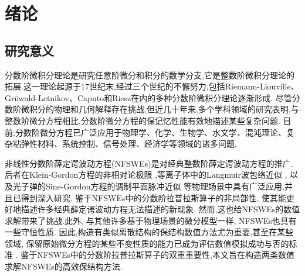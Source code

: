 \chapter[绪论]{绪论}

\section{研究意义}

分数阶微积分理论是研究任意阶微分和积分的数学分支,它是整数阶微积分理论的拓展.这一理论起源于17世纪末,经过三个世纪的不懈努力,包括Riemann-Liouville、Grüwald-Letnikov、Caputo和Riesz在内的多种分数阶微积分理论逐渐形成\cite{samkoFractionalIntegralsDerivatives1993}.
尽管分数阶微积分的物理和几何解释存在挑战,但近几十年来,多个学科领域的研究表明,与整数阶微分方程相比,分数阶微分方程的保记忆性能有效地描述某些复杂问题.
目前,分数阶微分方程已广泛应用于物理学、化学、生物学、水文学、混沌理论、复杂粘弹性材料、系统控制、信号处理、经济学等领域的诸多问题\cite{liIntroductionFractionalCalculus2015,HandbookDifferentialEquations2008,brychkovIndefiniteIntegrals2008,zhangMassBalanceBased2005,carrerasAnomalousDiffusionExit2001,maginSolvingFractionalOrder2009,zaslavskySelfsimilarTransportIncomplete1993,sunRandomorderFractionalDifferential2011}.%

非线性分数阶薛定谔波动方程(NFSWEs)是对经典整数阶薛定谔波动方程的推广.
后者在Klein-Gordon方程的非相对论极限 \cite{tsutsumiNonrelativisticApproximationNonlinear1984,machiharaNonrelativisticLimitEnergy2002},等离子体中的Langmuir波包络近似 \cite{colinSemidiscretizationTimeNonlinear1998},
以及光子弹的Sine-Gordon方程的调制平面脉冲近似 \cite{baoComparisonsSineGordonPerturbed2010,xinModelingLightBullets2000}等物理场景中具有广泛应用,并且已得到深入研究\cite{zhangConservativeNumericalScheme2003,baoUniformErrorEstimates2012,chengSeveralConservativeCompact2018,brugnanoClassEnergyconservingHamiltonian2018}.
鉴于NFSWEs中的分数阶拉普拉斯算子的非局部性, 使其能更好地描述许多经典薛定谔波动方程无法描述的新现象.
然而,这也给NFSWEs的数值求解带来了挑战.此外, 与其他许多基于物理场景的微分模型一样, NFSWEs也具有一些守恒性质. 
因此,构造有类似离散结构的保结构数值方法尤为重要,甚至在某些领域, 保留原始微分方程的某些不变性质的能力已成为评估数值模拟成功与否的标准 \cite{liFiniteDifferenceCalculus1995}.
鉴于NFSWEs中的分数阶拉普拉斯算子的双重重要性,本文旨在构造两类数值求解NFSWEs的高效保结构方法.

